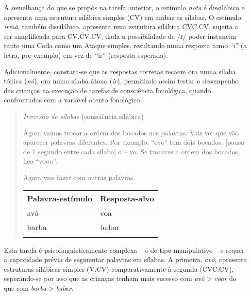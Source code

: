 \documentclass[output=paper,colorlinks,citecolor=brown,booklanguage=portuguese]{langscibook}
\begin{document}
À semelhança do que se propôs na tarefa anterior, o estímulo \emph{nota} é dissilábico e apresenta uma estrutura silábica simples (CV) em ambas as sílabas. O estímulo \emph{irmã}, também dissilábico, apresenta uma estrutura silábica CVC.CV, sujeita a ser simplificada para CV.CV.CV, dada a possibilidade de /ɾ/ poder instanciar tanto uma Coda como um Ataque simples, resultando numa resposta como “i” (a letra, por exemplo) em vez de “ir” (resposta esperada).

Adicionalmente, constata-se que as respostas corretas recaem ora numa sílaba tónica (\emph{nó}), ora numa sílaba átona (\emph{ir}), permitindo assim testar o desempenho das crianças na execução de tarefas de consciência fonológica, quando confrontadas com a variável acento fonológico \citep{Afonso2015, Freitas2019}.

\begin{quote}
\textit{Inversão de sílabas} (consciência silábica)

Agora vamos trocar a ordem dos bocados nas palavras. Vais ver que vão aparecer palavras diferentes. Por exemplo, “ovo” tem dois bocados: [pausa de 1 segundo entre cada sílaba] o – vo. Se trocares a ordem dos bocados, fica “voou”.

Agora vais fazer com outras palavras.



\begin{Tabela}
\begin{tabularx}{.8\textwidth}{Xl}
\lsptoprule
\textbf{Palavra-estímulo} & \textbf{Resposta-alvo}\\
\midrule
avô & voa\\
barba & babar\\
\lspbottomrule
\end{tabularx}
\end{Tabela}

\end{quote}


Esta tarefa é psicolinguisticamente complexa -- é de tipo manipulativo -- e requer a capacidade prévia de segmentar palavras em sílabas. A primeira, \emph{avô}, apresenta estruturas silábicas simples (V.CV) comparativamente à segunda (CVC.CV), esperando-se por isso que as crianças tenham mais sucesso com \emph{avô} > \emph{voar} do que com \emph{barba} > \emph{babar}.
\end{document}

